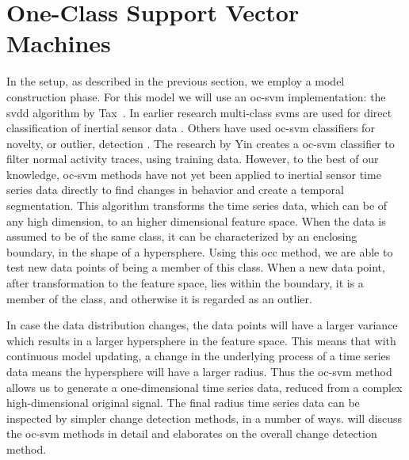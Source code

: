 \section{One-Class Support Vector Machines}
In the setup, as described in the previous section, we employ a model construction phase.
For this model we will use an \acrlong{oc-svm} implementation: the \acrlong{svdd} algorithm by Tax~\cite{tax2001one}.
In earlier research multi-class \glspl{svm} are used for direct classification of inertial sensor data \cite{he2008activity,mountrakis2011support,anguita2012human}.
Others have used \gls{oc-svm} classifiers for novelty, or outlier, detection \cite{scholkopf1999support,camci2010change,li2003improving,ma2003time,tax1999support}.
The research by Yin \etal  \cite{yin2008sensor} creates a \gls{oc-svm} classifier to filter normal activity traces, using training data.
However, to the best of our knowledge, \gls{oc-svm} methods have not yet been applied to inertial sensor time series data directly to find changes in behavior and create a temporal segmentation.
This algorithm transforms the time series data, which can be of any high dimension, to an higher dimensional feature space.
When the data is assumed to be of the same class, it can be characterized by an enclosing boundary, in the shape of a hypersphere.
Using this \gls{occ} method, we are able to test new data points of being a member of this class.
When a new data point, after transformation to the feature space, lies within the boundary, it is a member of the class, and otherwise it is regarded as an outlier.

In case the data distribution changes, the data points will have a larger variance which results in a larger hypersphere in the feature space.
This means that with continuous model updating, a change in the underlying process of a time series data means the hypersphere will have a larger radius.
Thus the \gls{oc-svm} method allows us to generate a one-dimensional time series data, reduced from a complex high-dimensional original signal.
The final radius time series data can be inspected by simpler change detection methods, in a number of ways.
 will discuss the \gls{oc-svm} methods in detail and  elaborates on the overall change detection method.

